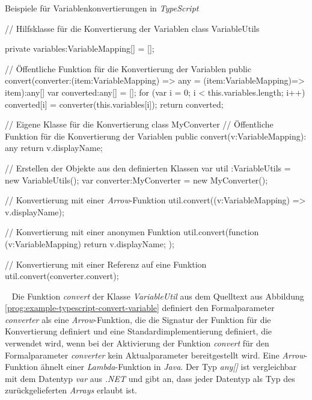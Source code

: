 \begin{program}[h]
\caption{Beispiele für Variablenkonvertierungen in \emph{TypeScript}}
\label{prog:example-typescript-convert-variable}
\begin{JsCode}
// Hilfsklasse für die Konvertierung der Variablen
class VariableUtils {
    private variables:VariableMapping[] = [];
	
    // Öffentliche Funktion für die Konvertierung der Variablen
    public convert(converter:(item:VariableMapping) => any 
    	                    = (item:VariableMapping)=> item):any[] {
        var converted:any[] = [];
        for (var i = 0; i < this.variables.length; i++) {
            converted[i] = converter(this.variables[i]);
        }
        return converted;	            
    }
}

// Eigene Klasse für die Konvertierung
class MyConverter {
    // Öffentliche Funktion für die Konvertierung der Variablen
    public convert(v:VariableMapping): any {
        return v.displayName;
    }
}

// Erstellen der Objekte aus den definierten Klassen
var util     :VariableUtils = new VariableUtils();
var converter:MyConverter   = new MyConverter();

// Konvertierung mit einer \emph{Arrow}-Funktion
util.convert((v:VariableMapping) => v.displayName);

// Konvertierung mit einer anonymen Funktion
util.convert(function (v:VariableMapping) {
    return v.displayName;
});

// Konvertierung mit einer Referenz auf eine Funktion
util.convert(converter.convert);
\end{JsCode} 
\end{program}
\ \newline
Die Funktion \emph{convert} der Klasse \emph{VariableUtil} aus dem Quelltext aus Abbildung \ref{prog:example-typescript-convert-variable} definiert den Formalparameter \emph{converter} als eine \emph{Arrow}-Funktion, die die Signatur der Funktion für die Konvertierung definiert und eine Standardimplementierung definiert, die verwendet wird, wenn bei der Aktivierung der Funktion \emph{convert} für den Formalparameter \emph{converter} kein Aktualparameter bereitgestellt wird.   Eine \emph{Arrow}-Funktion ähnelt einer \emph{Lambda}-Funktion in \emph{Java}. Der Typ \emph{any[]} ist vergleichbar mit dem Datentyp \emph{var} aus \emph{.NET} und gibt an, dass jeder Datentyp als Typ des zurückgelieferten \emph{Arrays} erlaubt ist.
\newpage

